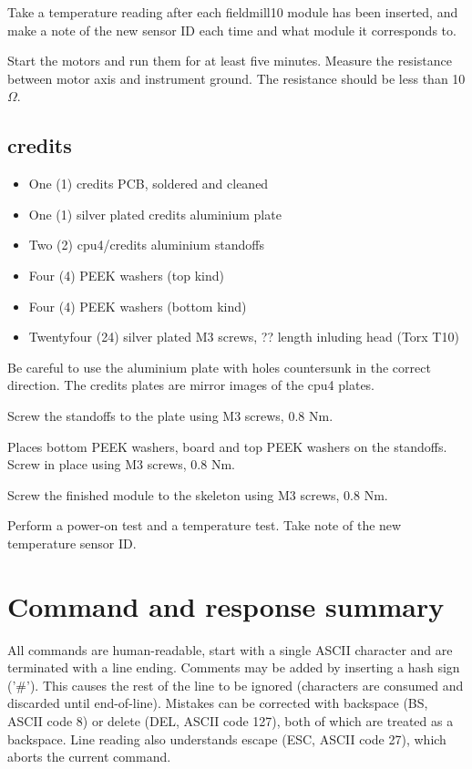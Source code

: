 \documentclass{article}
\begin{document}
Take a temperature reading after each fieldmill10 module has been inserted,
and make a note of the new sensor ID each time and what module it corresponds to.

Start the motors and run them for at least five minutes.
Measure the resistance between motor axis and instrument ground.
The resistance should be less than 10 $\Omega$.

\subsection{credits}

\begin{itemize}
\item One (1) credits PCB, soldered and cleaned
\item One (1) silver plated credits aluminium plate
\item Two (2) cpu4/credits aluminium standoffs
\item Four (4) PEEK washers (top kind)
\item Four (4) PEEK washers (bottom kind)
\item Twentyfour (24) silver plated M3 screws, ?? length inluding head (Torx T10)
\end{itemize}

Be careful to use the aluminium plate with holes countersunk in the correct direction.
The credits plates are mirror images of the cpu4 plates.

Screw the standoffs to the plate using M3 screws, 0.8 Nm.

Places bottom PEEK washers, board and top PEEK washers on the standoffs.
Screw in place using M3 screws, 0.8 Nm.

Screw the finished module to the skeleton using M3 screws, 0.8 Nm.

Perform a power-on test and a temperature test.
Take note of the new temperature sensor ID.

\newpage
\section{Command and response summary}

All commands are human-readable, start with a single ASCII character and are terminated with a line ending.
Comments may be added by inserting a hash sign ('\#').
This causes the rest of the line to be ignored (characters are consumed and discarded until end-of-line).
Mistakes can be corrected with backspace (BS, ASCII code 8) or delete (DEL, ASCII code 127), both of which are treated as a backspace.
Line reading also understands escape (ESC, ASCII code 27), which aborts the current command.
\end{document}

